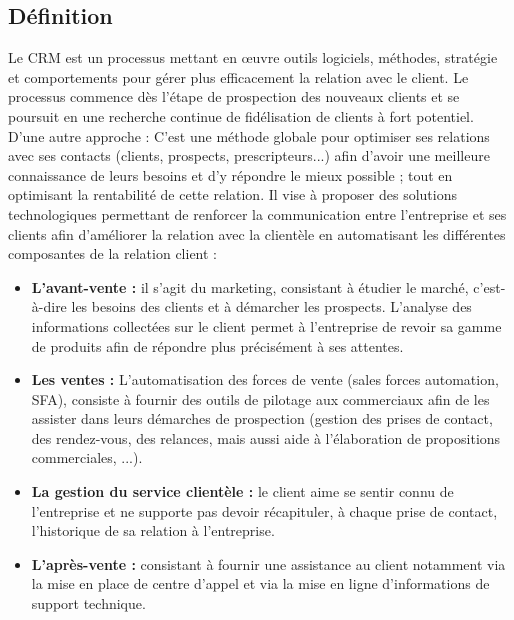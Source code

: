 \documentclass[a4paper, 12pt]{report}
\begin{document}
\begin{itemize}
\subsection {Définition}
 Le CRM est un processus mettant en œuvre outils logiciels, méthodes, stratégie et comportements pour gérer plus efficacement la relation avec le client. Le processus commence dès l'étape de prospection des nouveaux clients et se poursuit en une recherche continue de fidélisation de clients à fort potentiel. D'une autre approche : C'est une méthode globale pour optimiser ses relations avec ses contacts (clients, prospects, prescripteurs...) afin d'avoir une meilleure connaissance de leurs besoins et d'y répondre le mieux possible ; tout en optimisant la rentabilité de cette relation. 
Il vise à proposer des solutions technologiques permettant de renforcer la communication entre l'entreprise et ses clients afin d'améliorer la relation avec la clientèle en automatisant les différentes composantes de la relation client :  
\begin{itemize}
	\item 
\textbf{L'avant-vente :} il s'agit du marketing, consistant à étudier le marché, c'est-à-dire les besoins des clients et à démarcher les prospects. L'analyse des informations collectées sur le client permet à l'entreprise de revoir sa gamme de produits afin de répondre plus précisément à ses attentes.  
\item	\textbf{ Les ventes :} L'automatisation des forces de vente (sales forces automation, SFA), consiste à fournir des outils de pilotage aux commerciaux afin de les assister dans leurs démarches de prospection (gestion des prises de contact, des rendez-vous, des relances, mais aussi aide à l'élaboration de propositions commerciales, ...). 
\item	\textbf{La gestion du service clientèle :} le client aime se sentir connu de l'entreprise et ne supporte pas devoir récapituler, à chaque prise de contact, l'historique de sa relation à l'entreprise. 
\item	 \textbf{L'après-vente :} consistant à fournir une assistance au client notamment via la mise en place de centre d'appel et via la mise en ligne d'informations de support technique. 
\end{itemize}

\end{itemize}
\end{document}
